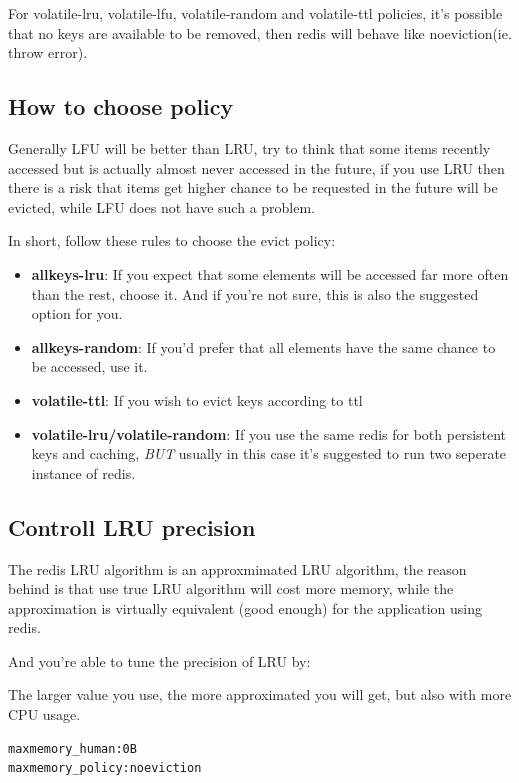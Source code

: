 \documentclass[12pt]{article}
\begin{document}
For volatile-lru, volatile-lfu, volatile-random and volatile-ttl policies, it's possible that no keys are available to be removed, then redis will behave like noeviction(ie. throw error).

\subsection{How to choose policy}\label{how-to-choose-policy}

Generally LFU will be better than LRU, try to think that some items recently accessed but is actually almost never accessed in the future, if you use LRU then there is a risk that items get higher chance to be requested in the future will be evicted, while LFU does not have such a problem.

In short, follow these rules to choose the evict policy:

\begin{itemize}
\tightlist
\item
  \textbf{allkeys-lru}: If you expect that some elements will be accessed far more often than the rest, choose it. And if you're not sure, this is also the suggested option for you.
\item
  \textbf{allkeys-random}: If you'd prefer that all elements have the same chance to be accessed, use it.
\item
  \textbf{volatile-ttl}: If you wish to evict keys according to ttl
\item
  \textbf{volatile-lru/volatile-random}: If you use the same redis for both persistent keys and caching, \emph{BUT} usually in this case it's suggested to run two seperate instance of redis.
\end{itemize}

\subsection{Controll LRU precision}\label{controll-lru-precision}

The redis LRU algorithm is an approxmimated LRU algorithm, the reason behind is that use true LRU algorithm will cost more memory, while the approximation is virtually equivalent (good enough) for the application using redis.

And you're able to tune the precision of LRU by:

\begin{Shaded}
\begin{Highlighting}[]
\end{Highlighting}
\end{Shaded}

The larger value you use, the more approximated you will get, but also with more CPU usage.

\begin{verbatim}
maxmemory_human:0B
maxmemory_policy:noeviction
\end{verbatim}
\end{document}
